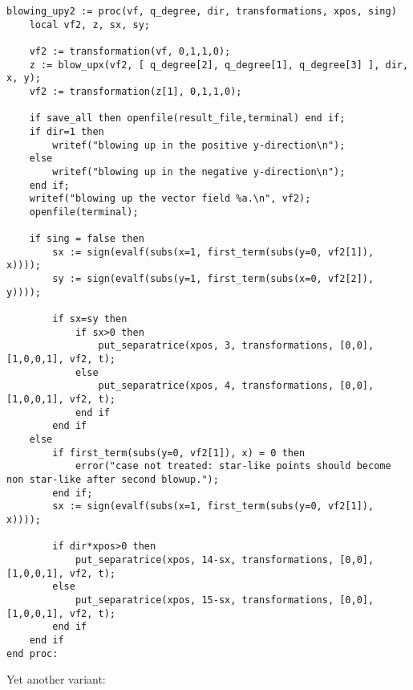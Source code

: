 \documentclass[a4paper,10pt]{article}
\begin{document}
\begin{lstlisting}[name=blowup]
blowing_upy2 := proc(vf, q_degree, dir, transformations, xpos, sing)
    local vf2, z, sx, sy;

    vf2 := transformation(vf, 0,1,1,0);
    z := blow_upx(vf2, [ q_degree[2], q_degree[1], q_degree[3] ], dir, x, y);
    vf2 := transformation(z[1], 0,1,1,0);

    if save_all then openfile(result_file,terminal) end if;
    if dir=1 then
        writef("blowing up in the positive y-direction\n");
    else
        writef("blowing up in the negative y-direction\n");
    end if;
    writef("blowing up the vector field %a.\n", vf2);
    openfile(terminal);

    if sing = false then
        sx := sign(evalf(subs(x=1, first_term(subs(y=0, vf2[1]), x))));
        sy := sign(evalf(subs(y=1, first_term(subs(x=0, vf2[2]), y))));

        if sx=sy then
            if sx>0 then
                put_separatrice(xpos, 3, transformations, [0,0], [1,0,0,1], vf2, t);
            else
                put_separatrice(xpos, 4, transformations, [0,0], [1,0,0,1], vf2, t);
            end if
        end if
    else
        if first_term(subs(y=0, vf2[1]), x) = 0 then
            error("case not treated: star-like points should become non star-like after second blowup.");
        end if;
        sx := sign(evalf(subs(x=1, first_term(subs(y=0, vf2[1]), x))));

        if dir*xpos>0 then
            put_separatrice(xpos, 14-sx, transformations, [0,0], [1,0,0,1], vf2, t);
        else
            put_separatrice(xpos, 15-sx, transformations, [0,0], [1,0,0,1], vf2, t);
        end if
    end if
end proc:
\end{lstlisting}

Yet another variant:
\end{document}
